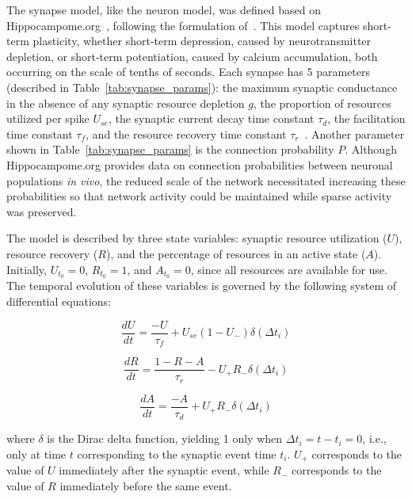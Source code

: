 The synapse model, like the neuron model, was defined based on Hippocampome.org~\parencite{wheelerHippocampomeorg2023}, following the
formulation of~\textcite{sennAlgorithm2001}\parencite{mongilloSynaptic2008a}. This model captures short-term plasticity, whether
short-term depression, caused by neurotransmitter depletion, or short-term potentiation, caused by calcium
accumulation, both occurring on the scale of tenths of seconds. Each synapse has 5 parameters (described in
Table~\ref{tab:synapse_params}): the maximum synaptic conductance in the absence of any synaptic resource depletion $g$, the
proportion of resources utilized per spike $U_{se}$, the synaptic current decay time constant $\tau_d$, the facilitation time
constant $\tau_f$, and the resource recovery time constant $\tau_r$~\parencite{moradiNormalized2022}. Another parameter shown in
Table~\ref{tab:synapse_params} is the connection probability $P$. Although Hippocampome.org provides data on connection
probabilities between neuronal populations \textit{in vivo}, the reduced scale of the network necessitated increasing these
probabilities so that network activity could be maintained while sparse activity was preserved.

The model is described by three state variables: synaptic resource utilization ($U$), resource recovery ($R$), and the
percentage of resources in an active state ($A$). Initially, $U_{t_0} = 0$, $R_{t_0} = 1$, and $A_{t_0} = 0$, since all
resources are available for use. The temporal evolution of these variables is governed by the following system of differential
equations:

\begin{equation}
    \label{eq_tsodyks_dU}
    \frac{dU}{dt} = \frac{-U}{\tau_f} + U_{se}(1-U_{-}) \delta(\Delta t_i)
\end{equation}

\begin{equation}
    \label{eq_tsodyks_dR}
    \frac{dR}{dt} = \frac{1-R-A}{\tau_r} - U_{+} R_{-} \delta(\Delta t_i)
\end{equation}

\begin{equation}
    \label{eq_tsodyks_dA}
    \frac{dA}{dt} = \frac{-A}{\tau_d} + U_{+} R_{-} \delta(\Delta t_i)
\end{equation}

where $\delta$ is the Dirac delta function, yielding 1 only when $\Delta t_i = t - t_i = 0$, i.e., only at time $t$
corresponding to the synaptic event time $t_i$. $U_{+}$ corresponds to the value of $U$ immediately after the synaptic event,
while $R_{-}$ corresponds to the value of $R$ immediately before the same event.

